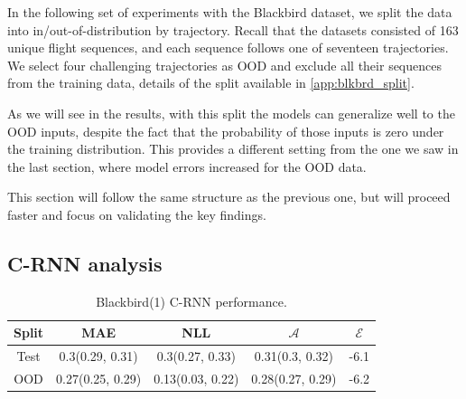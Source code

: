 In the following set of experiments with the Blackbird dataset, we split the data into in/out-of-distribution by trajectory. Recall that the datasets consisted of 163 unique flight sequences, and each sequence follows one of seventeen trajectories. We select four challenging trajectories as OOD and exclude all their sequences from the training data, details of the split available in \cref{app:blkbrd_split}. 

As we will see in the results, with this split the models can generalize well to the OOD inputs, despite the fact that the probability of those inputs is zero under the training distribution. This provides a different setting from the one we saw in the last section, where model errors increased for the OOD data.

This section will follow the same structure as the previous one, but will proceed faster and focus on validating the key findings. 

\subsection{C-RNN analysis}

\begin{table}[h]
\centering
    \begin{tabular}{c  c  c   c  c }  
        \toprule
        Split & MAE & NLL & $\mathcal{A}$ & $\mathcal{E}$\\
        \midrule
        Test & 0.3(0.29, 0.31) & 0.3(0.27, 0.33) & 0.31(0.3, 0.32) &  -6.1\\
        OOD  &  0.27(0.25, 0.29) &  0.13(0.03, 0.22) & 0.28(0.27, 0.29)&  -6.2\\
        \midrule
    \end{tabular}
    \caption{Blackbird(1) C-RNN performance.}
    \label{tbl:bb1_CRNN}
\end{table}


